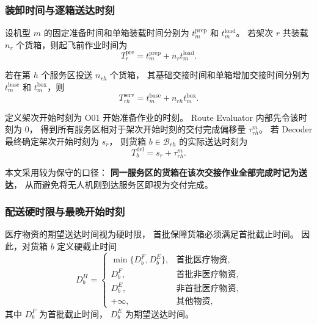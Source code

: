 \subsubsection{装卸时间与逐箱送达时刻}

设机型 $m$ 的固定准备时间和单箱装载时间分别为
$t_m^{\mathrm{prep}}$ 和 $t_m^{\mathrm{load}}$。
若架次 $r$ 共装载 $n_r$ 个货箱，则起飞前作业时间为
\begin{equation}
	T_r^{\mathrm{pre}}
	=
	t_m^{\mathrm{prep}}+n_r t_m^{\mathrm{load}}.
	\label{eq:q2-pre-time}
\end{equation}

若在第 $h$ 个服务区投送 $n_{rh}$ 个货箱，
其基础交接时间和单箱增加交接时间分别为
$t_m^{\mathrm{base}}$ 和 $t_m^{\mathrm{box}}$，则
\begin{equation}
	T_{rh}^{\mathrm{serv}}
	=
	t_m^{\mathrm{base}}
	+n_{rh}t_m^{\mathrm{box}}.
	\label{eq:q2-service-time}
\end{equation}

定义架次开始时刻为 O01 开始准备作业的时刻。
Route Evaluator 内部先令该时刻为 0，
得到所有服务区相对于架次开始时刻的交付完成偏移量
$\tau_{rh}^m$。
若 Decoder 最终确定架次开始时刻为 $s_r$，
则货箱 $b\in\mathcal{B}_{rh}$ 的实际送达时刻为
\begin{equation}
	T_b^{\mathrm{del}}
	=
	s_r+\tau_{rh}^{m}.
	\label{eq:q2-delivery-time}
\end{equation}

本文采用较为保守的口径：
\textbf{同一服务区的货箱在该次交接作业全部完成时记为送达}，
从而避免将无人机刚到达服务区即视为交付完成。

\subsubsection{配送硬时限与最晚开始时刻}

医疗物资的期望送达时间视为硬时限，
首批保障货箱必须满足首批截止时间。
因此，对货箱 $b$ 定义硬截止时间
\begin{equation}
	D_b^{H}
	=
	\begin{cases}
		\min\{D_b^{F},D_b^{E}\},
		& \text{首批医疗物资},\\
		D_b^{F},
		& \text{首批非医疗物资},\\
		D_b^{E},
		& \text{非首批医疗物资},\\
		+\infty,
		& \text{其他物资},
	\end{cases}
	\label{eq:q2-hard-deadline}
\end{equation}
其中 $D_b^F$ 为首批截止时间，
$D_b^E$ 为期望送达时间。

